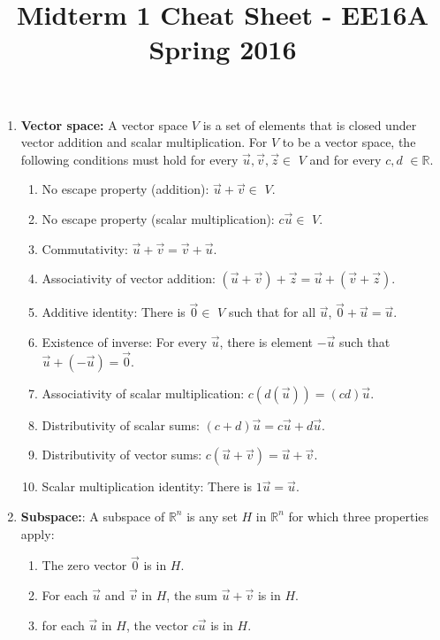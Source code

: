 \documentclass[11pt]{article}
\begin{document}
\date{}
\title{\vspace{-5ex}Midterm 1 Cheat Sheet - EE16A Spring 2016\vspace{-5ex}}
\maketitle
\begin{enumerate}
    \item \textbf{Vector space:} A vector space $V$ is a set of elements that is closed under vector addition and scalar multiplication. For $V$ to be a vector space, the following conditions must hold for every $\vec{u},\vec{v},\vec{z} \in$ $V$ and for every $c,d$ $\in \mathbb{R}$.
    \begin{enumerate}
        \item No escape property (addition): $\vec{u}+\vec{v} \in$ $V$.
        \item No escape property (scalar multiplication): $c\vec{u} \in$ $V$.
        \item Commutativity: $\vec{u}+\vec{v}=\vec{v}+\vec{u}$.
        \item Associativity of vector addition: $(\vec{u}+\vec{v})+\vec{z} =\vec{u}+(\vec{v}+\vec{z})$.
        \item Additive identity: There is $\vec{0} \in$ $V$ such that for all $\vec{u}$, $\vec{0}+\vec{u}=\vec{u}$.
        \item Existence of inverse: For every $\vec{u}$, there is element $-\vec{u}$ such that $\vec{u}+(-\vec{u}) = \vec{0}$.
        \item Associativity of scalar multiplication: $c(d(\vec{u})) = (cd)\vec{u}$.
        \item Distributivity of scalar sums: $(c+d)\vec{u} = c\vec{u}+d\vec{u}$.
        \item Distributivity of vector sums: $c(\vec{u}+\vec{v}) = \vec{u}+\vec{v}$.
        \item Scalar multiplication identity: There is $1\vec{u} =\vec{u}$.
    \end{enumerate}
    
    \item \textbf{Subspace:}: A subspace of $\mathbb{R}^n$ is any set $H$ in $\mathbb{R}^n$ for which three properties apply: 
    \begin{enumerate}
        \item The zero vector $\vec{0}$ is in $H$.
        \item For each $\vec{u}$ and $\vec{v}$ in $H$, the sum $\vec{u}+\vec{v}$ is in $H$.
        \item for each $\vec{u}$ in $H$, the vector $c\vec{u}$ is in $H$.
    \end{enumerate}
    

\end{enumerate}
\end{document}
